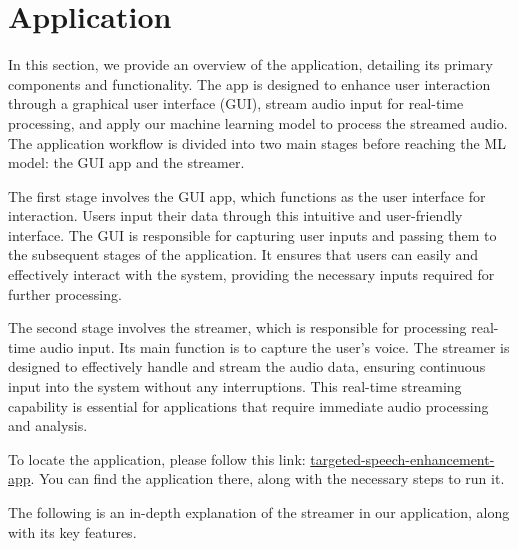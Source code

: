 \chapter{Application}
\label{chap:application}
\begingroup
\let\clearpage\relax

In this section, we provide an overview of the application, detailing its primary components and functionality. The app is designed to enhance user interaction through a graphical user interface (GUI), stream audio input for real-time processing, and apply our machine learning model to process the streamed audio. The application workflow is divided into two main stages before reaching the ML model: the GUI app and the streamer.

The first stage involves the GUI app, which functions as the user interface for interaction. Users input their data through this intuitive and user-friendly interface. The GUI is responsible for capturing user inputs and passing them to the subsequent stages of the application. It ensures that users can easily and effectively interact with the system, providing the necessary inputs required for further processing.

The second stage involves the streamer, which is responsible for processing real-time audio input. Its main function is to capture the user's voice. The streamer is designed to effectively handle and stream the audio data, ensuring continuous input into the system without any interruptions. This real-time streaming capability is essential for applications that require immediate audio processing and analysis.

To locate the application, please follow this link: \href{https://github.com/YoussefMagdy10/targeted-speech-enhancement-app}{targeted-speech-enhancement-app}{}. You can find the application there, along with the necessary steps to run it.

The following is an in-depth explanation of the streamer in our application, along with its key features.



\endgroup
